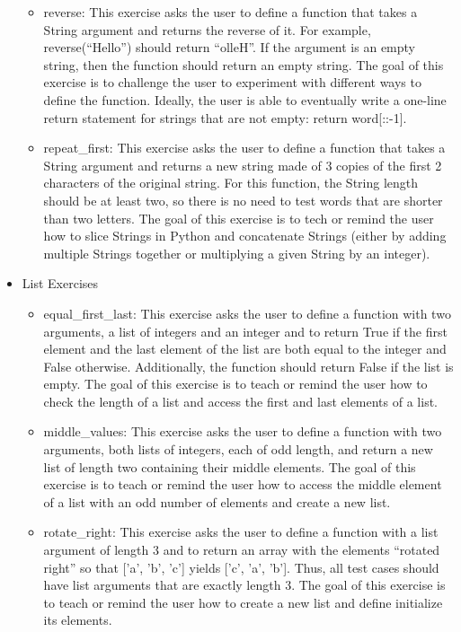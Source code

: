 \documentclass[10pt,twocolumn]{article}
\begin{document}
\begin{itemize}
\begin{itemize}
        \item{reverse: This exercise asks the user to define a function that takes a String argument and returns the reverse of it. For example, reverse(\enquote{Hello}) should return \enquote{olleH}. If the argument is an empty string, then the function should return an empty string. The goal of this exercise is to challenge the user to experiment with different ways to define the function. Ideally, the user is able to eventually write a one-line return statement for strings that are not empty: return word[::-1].}
        \item{repeat\_first: This exercise asks the user to define a function that takes a String argument and returns a new string made of 3 copies of the first 2 characters of the original string. 
        For this function, the String length should be at least two, so there is no need to test words that are shorter than two letters. The goal of this exercise is to tech or remind the user how to slice Strings in Python and concatenate Strings (either by adding multiple Strings together or multiplying a given String by an integer).}
    \end{itemize}
    \item{List Exercises}
    \begin{itemize}
        \item{equal\_first\_last: This exercise asks the user to define a function with two arguments, a list of integers and an integer and to return True if the first element and the last element of the list are both equal to the integer and False otherwise. Additionally, the function should return False if the list is empty. The goal of this exercise is to teach or remind the user how to check the length of a list and access the first and last elements of a list.}
        \item{middle\_values: This exercise asks the user to define a function with two arguments, both lists of integers, each of odd length, and return a new list of length two containing their middle elements. The goal of this exercise is to teach or remind the user how to access the middle element of a list with an odd number of elements and create a new list.}
        \item{rotate\_right: This exercise asks the user to define a function with a list argument of length 3 and to return an array with the elements \enquote{rotated right} so that ['a', 'b', 'c'] yields ['c', 'a', 'b']. Thus, all test cases should have list arguments that are exactly length 3. The goal of this exercise is to teach or remind the user how to create a new list and define initialize its elements.}

\end{itemize}
\end{itemize}
\end{document}
